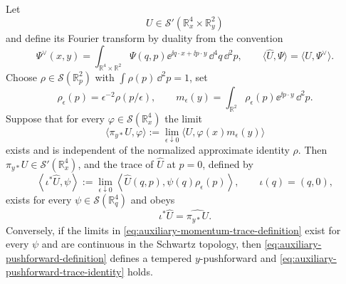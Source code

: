 \begin{lemma}[Auxiliary pushforward and the \(p=0\) momentum trace]
\label{lem:auxiliary-pushforward-momentum-trace}
Let
\[
  U\in\mathcal S'(\mathbb R_x^4\times\mathbb R_y^2)
\]
and define its Fourier transform by duality from the convention
\begin{equation}
  \Psi^\vee(x,y)
  =
  \int_{\mathbb R^4\times\mathbb R^2}
  \Psi(q,p)\ee^{\ii q\cdot x+\ii p\cdot y}
  \,\dd^4q\,\dd^2p,
  \qquad
  \langle\widehat U,\Psi\rangle=\langle U,\Psi^\vee\rangle .
  \label{eq:auxiliary-trace-fourier-convention}
\end{equation}
Choose \(\rho\in\mathcal S(\mathbb R^2_p)\) with
\(\int\rho(p)\,\dd^2p=1\), set
\begin{equation}
  \rho_\epsilon(p)=\epsilon^{-2}\rho(p/\epsilon),
  \qquad
  m_\epsilon(y)=\int_{\mathbb R^2}\rho_\epsilon(p)
  \ee^{\ii p\cdot y}\,\dd^2p .
  \label{eq:auxiliary-trace-mollifier}
\end{equation}
Suppose that for every \(\varphi\in\mathcal S(\mathbb R_x^4)\) the limit
\begin{equation}
  \langle\pi_{y*}U,\varphi\rangle
  :=
  \lim_{\epsilon\downarrow0}
  \langle U,\varphi(x)m_\epsilon(y)\rangle
  \label{eq:auxiliary-pushforward-definition}
\end{equation}
exists and is independent of the normalized approximate identity \(\rho\).
Then \(\pi_{y*}U\in\mathcal S'(\mathbb R_x^4)\), and the trace of
\(\widehat U\) at \(p=0\), defined by
\begin{equation}
  \left\langle \iota^*\widehat U,\psi\right\rangle
  :=
  \lim_{\epsilon\downarrow0}
  \left\langle
    \widehat U(q,p),
    \psi(q)\rho_\epsilon(p)
  \right\rangle ,
  \qquad
  \iota(q)=(q,0),
  \label{eq:auxiliary-momentum-trace-definition}
\end{equation}
exists for every \(\psi\in\mathcal S(\mathbb R_q^4)\) and obeys
\begin{equation}
  \iota^*\widehat U=\widehat{\pi_{y*}U}.
  \label{eq:auxiliary-pushforward-trace-identity}
\end{equation}
Conversely, if the limits in
\eqref{eq:auxiliary-momentum-trace-definition} exist for every
\(\psi\) and are continuous in the Schwartz topology, then
\eqref{eq:auxiliary-pushforward-definition} defines a tempered
\(y\)-pushforward and
\eqref{eq:auxiliary-pushforward-trace-identity} holds.
\end{lemma}

